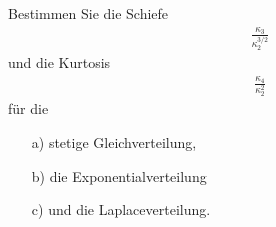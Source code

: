 \newcommand{\kum}[1]{\E((X-\E(X))^{#1})}
\newcommand{\ergebnis}[1]{\frac{\left(\frac{b-a}{2}\right)^{#1} - \left(\frac{a-b}{2}\right)^{#1}}{#1(b-a)}}
\begin{exercise}
Bestimmen Sie die Schiefe
\begin{align*}
  \frac{\kappa_3}{\kappa_2^{3/2}}
\end{align*}
und die Kurtosis
\begin{align*}
  \frac{\kappa_4}{\kappa_2^2}
\end{align*}
für die
\begin{itemize}
  \item[a)] stetige Gleichverteilung,
  \item[b)] die Exponentialverteilung
  \item[c)] und die Laplaceverteilung.
\end{itemize}
\end{exercise}

